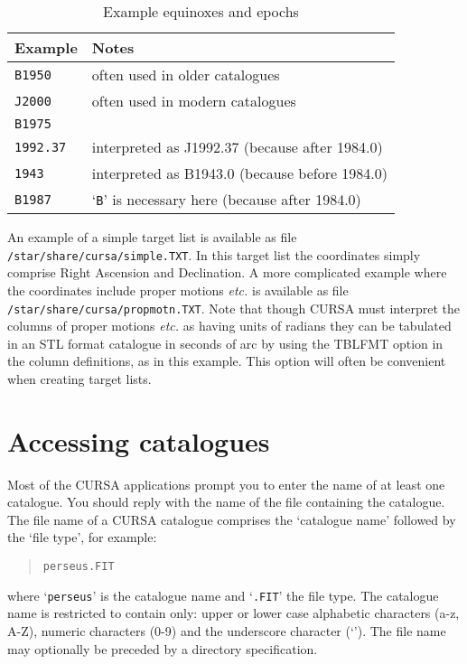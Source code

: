 \documentclass[twoside,11pt]{article}
\newcommand{\xlabel}[1]{}
\renewcommand{\_}{\texttt{\symbol{95}}}
\begin{document}
\begin{table}[htbp]

\begin{center}
\begin{tabular}{ll}
Example        & Notes  \\ \hline
{\tt B1950}    & often used in older catalogues \\
{\tt J2000}    & often used in modern catalogues \\
{\tt B1975}    & \\
{\tt 1992.37}  & interpreted as J1992.37 (because after 1984.0)  \\
{\tt 1943}     & interpreted as B1943.0 (because before 1984.0)  \\
{\tt B1987}    & `{\tt B}' is necessary here (because after 1984.0)  \\
\end{tabular}

\caption{Example equinoxes and epochs \label{EQEP} }
\end{center}

\end{table}

An example of a simple target list is available as file {\tt
/star/share/cursa/simple.TXT}.  In this target list the coordinates
simply comprise Right Ascension and Declination.  A more complicated
example where the coordinates include proper motions \emph{etc.} is
available as file {\tt /star/share/cursa/propmotn.TXT}.  Note that
though CURSA must interpret the columns of proper motions \emph{etc.} as
having units of radians they can be tabulated in an STL format catalogue
in seconds of arc by using the TBLFMT option in the column definitions,
as in this example.  This option will often be convenient when creating
target lists.


\section{\xlabel{ACCESS}Accessing catalogues}

Most of the CURSA applications prompt you to enter the name of at least
one catalogue.  You should reply with the name of the file containing the
catalogue.  The file name of a CURSA catalogue comprises the `catalogue
name' followed by the `file type', for example:

\begin{verse}
{\tt perseus.FIT}
\end{verse}

where `{\tt perseus}' is the catalogue name and `{\tt .FIT}' the file
type.  The catalogue name is restricted to contain only: upper or lower
case alphabetic characters (a-z, A-Z), numeric characters (0-9) and the
underscore character (`\_').  The file name may optionally be preceded by
a directory specification.
\end{document}
